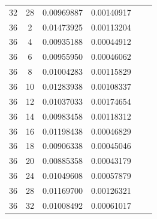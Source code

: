 \documentclass[letterpaper,12pt]{article}
\theoremstyle{remark}
\begin{document}
\begin{tabular}{cccccc}
32 & 28 & 0.00969887 & 0.00140917 \\
36 & 2 & 0.01473925 & 0.00113204 \\
36 & 4 & 0.00935188 & 0.00044912 \\
36 & 6 & 0.00955950 & 0.00046062 \\
36 & 8 & 0.01004283 & 0.00115829 \\
36 & 10 & 0.01283938 & 0.00108337 \\
36 & 12 & 0.01037033 & 0.00174654 \\
36 & 14 & 0.00983458 & 0.00118312 \\
36 & 16 & 0.01198438 & 0.00046829 \\
36 & 18 & 0.00906338 & 0.00045046 \\
36 & 20 & 0.00885358 & 0.00043179 \\
36 & 24 & 0.01049608 & 0.00057879 \\
36 & 28 & 0.01169700 & 0.00126321 \\
36 & 32 & 0.01008492 & 0.00061017 \\
\end{tabular}
\end{document}
